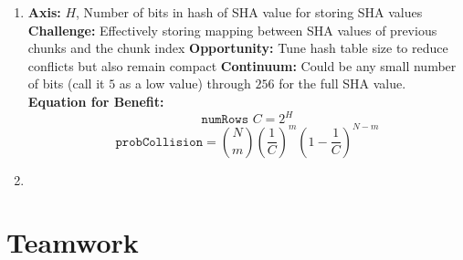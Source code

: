 \documentclass{article}
\begin{document}
\begin{enumerate}
\item%

\textbf{Axis:} $H$, Number of bits in hash of SHA value for storing SHA values
\newline
\textbf{Challenge:} Effectively storing mapping between SHA values of previous chunks and the chunk index
\newline
\textbf{Opportunity:} Tune hash table size to reduce conflicts but also remain compact
\newline
\textbf{Continuum:} Could be any small number of bits (call it $5$ as a low value) through $256$ for the full SHA value.
\newline
\textbf{Equation for Benefit:}
\[
\texttt{numRows }C=2^H
\]
\[
\texttt{probCollision}={N \choose m}\left(\frac{1}{C}\right)^m \left(1 - \frac{1}{C}\right)^{N-m}
\]

\item%


\end{enumerate}


\section{Teamwork}


\begin{appendices}
%
%
%


\end{appendices}
\end{document}
